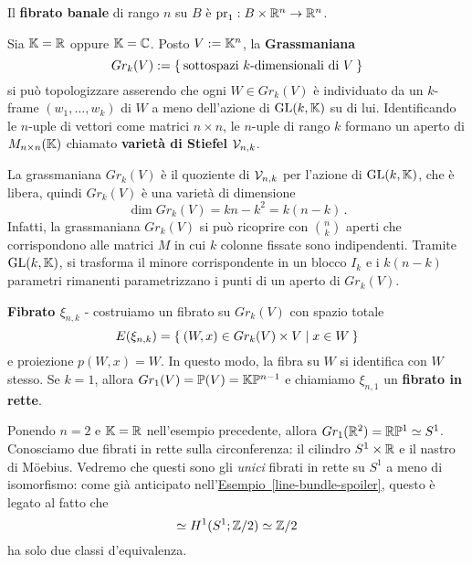 \begin{ex!}\label{esempi-fibrati}
	\begin{rmnumerate}
		\item Il \textbf{fibrato banale} di rango $n$ su 
		$B$ è $\mathrm{pr}_{1}:B \times {\mathbb R}^{n} \to {\mathbb R}^{n}$.
		
		\item Sia $\mathbb{K} = {\mathbb R}$ oppure $\mathbb{K} = \mathbb{C}$.
		Posto $V := \mathbb{K}^{n}$, la \textbf{Grassmaniana} 
		\begin{equation*}
			Gr_{k}(V) := \Set{\text{sottospazi } k\text{-dimensionali di } V}
		\end{equation*}
		si può topologizzare asserendo che ogni $W \in Gr_{k}(V)$
		è individuato da un $k$-frame $(w_{1}, \dots, w_{k})$ di $W$
		a meno dell'azione di $\mathrm{GL}(k,\mathbb{K})$ su di lui.
		Identificando le $n$-uple di vettori come matrici $n \times n$,
		le $n$-uple di rango $k$ formano un aperto di $M_{n \times n}(\mathbb{K})$
		chiamato \textbf{varietà di Stiefel} $\mathcal{V}_{n,k}$. 
		
		La grassmaniana $Gr_{k}(V)$ è il quoziente di $\mathcal{V}_{n,k}$
		per l'azione di $\mathrm{GL}(k,\mathbb{K})$, che è libera,
		quindi $Gr_{k}(V)$ è una varietà di dimensione
		\begin{equation*}
			\dim Gr_{k}(V) = kn - k^2 = k(n-k)\,.
		\end{equation*}
		Infatti, la grassmaniana $Gr_{k}(V)$ si può ricoprire con $\binom{n}{k}$ aperti
		che corrispondono alle matrici $M$ in cui $k$ colonne fissate sono indipendenti.
		Tramite $\mathrm{GL}(k,\mathbb{K})$, si trasforma il minore corrispondente
		in un blocco $I_{k}$ e i $k(n-k)$ parametri rimanenti parametrizzano 
		i punti di un aperto di $Gr_{k}(V)$.
		
		\textbf{Fibrato $\xi_{n,k}$} - costruiamo un fibrato su $Gr_{k}(V)$
		con spazio totale
		\begin{equation*}
			E(\xi_{n,k}) = \Set{(W,x) \in Gr_{k}(V) \times V | x \in W}
		\end{equation*}
		e proiezione $p(W,x)=W$. In questo modo,
		la fibra su $W$ si identifica con $W$ stesso.
		Se $k=1$, allora $Gr_{1}(V) = \mathbb{P}(V) = \mathbb{K}\mathbb{P}^{n-1}$ e chiamiamo
		$\xi_{n,1}$ un \textbf{fibrato in rette}.
		
		\item Ponendo $n=2$ e $\mathbb{K} = {\mathbb R}$ nell'esempio precedente,
		allora $Gr_{1}({\mathbb R}^{2}) = {\mathbb R}\mathbb{P}^{1} \simeq S^{1}$.
		Conosciamo due fibrati in rette sulla circonferenza:
		il cilindro $S^{1} \times {\mathbb R}$ e il nastro di Möebius.
		Vedremo che questi sono gli \emph{unici} fibrati in rette su $S^{1}$
		a meno di isomorfismo: come già anticipato 
		nell'\hyperref[line-bundle-spoiler]{Esempio~\ref{line-bundle-spoiler}},
		questo è legato al fatto che
		\begin{equation*}
			[S^{1},\R\PP^{\infty}] \simeq H^{1}(S^{1};\Z/2) \simeq \Z/2
		\end{equation*}
		ha solo due classi d'equivalenza.
		

\end{rmnumerate}
\end{ex!}
